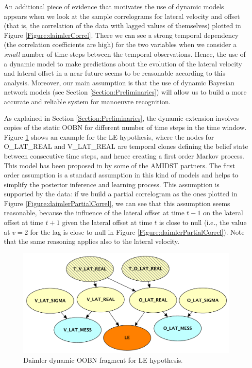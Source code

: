 An additional piece of evidence that motivates the use of dynamic models appears when we look at the sample correlograms for lateral velocity and offset (that is, the correlation of the data with lagged values of themselves) plotted in Figure \ref{Figure:daimlerCorrel}. There we can see a strong temporal dependency (the correlation coefficients are high) for the two variables when we consider a \textit{small} number of time-steps between the temporal observations. Hence, the use of a dynamic model to make predictions about the evolution of the lateral velocity and lateral offset in a near future seems to be reasonable according to this analysis. Moreover, our main assumption is that the use of dynamic Bayesian network models (see Section \ref{Section:Preliminaries}) will allow us to build a more accurate and reliable system for manoeuvre recognition. 

As explained in Section \ref{Section:Preliminaries}, the dynamic extension involves copies of the static OOBN for different number of time steps in the time window. Figure \ref{Figure:daimlerLEdyn} shows an example for the LE hypothesis, where the nodes for O\_LAT\_REAL and V\_LAT\_REAL are temporal clones defining the belief state between consecutive time steps, and hence creating a first order Markov process. This model has been proposed in \cite{Weidl2014} by some of the AMIDST partners. The first order assumption is a standard assumption in this kind of models and helps to simplify the posterior inference and learning process. This assumption is supported by the data: if we build a partial correlogram as the ones plotted in Figure \ref{Figure:daimlerPartialCorrel}, we can see that this assumption seems reasonable, because the influence of the lateral offset at time $t-1$ on the lateral offset at time $t+1$ given the lateral offset at time $t$ is close to null (i.e., the value at $v=2$ for the lag is close to null in Figure \ref{Figure:daimlerPartialCorrel}). Note that the same reasoning applies also to the lateral velocity.

\begin{figure}[ht!]
\begin{center}
\includegraphics[scale=0.48]{./figures/DaimlerLEdyn}
\end{center}
\caption{\label{Figure:daimlerLEdyn}Daimler dynamic OOBN fragment for LE hypothesis.}
\end{figure}

